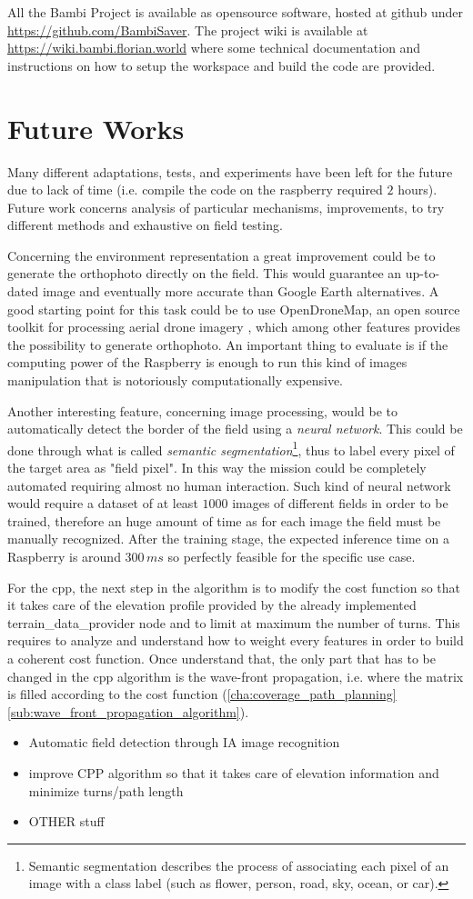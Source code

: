 All the Bambi Project is available as opensource software, hosted at github under \url{https://github.com/BambiSaver}.
The project wiki is available at \url{https://wiki.bambi.florian.world} where some technical documentation and instructions on how to setup the workspace and build the code are provided.

\section{Future Works} %
\label{sec:future_work}
Many different adaptations, tests, and experiments have been left for the future due to lack of time (i.e. compile the code on the raspberry required $2$ hours). Future work concerns analysis of particular mechanisms, improvements, to try different methods and exhaustive on field testing.\par
Concerning the environment representation a great improvement could be to generate the orthophoto directly on the field. This would guarantee an up-to-dated image and eventually more accurate than Google Earth alternatives. A good starting point for this task could be to use \textsf{OpenDroneMap}, an open source toolkit for processing aerial drone imagery \cite{ODM}, which among other features provides the possibility to generate orthophoto. An important thing to evaluate is if the computing power of the Raspberry is enough to run this kind of images manipulation that is notoriously computationally expensive.\par
Another interesting feature, concerning image processing, would be to automatically detect the border of the field using a \textit{neural network}. This could be done through what is called \textit{semantic segmentation}\footnote{ Semantic segmentation describes the process of associating each pixel of an image with a class label (such as flower, person, road, sky, ocean, or car).}, thus to label every pixel of the target area as "field pixel". In this way the mission could be completely automated requiring almost no human interaction. Such kind of neural network would require a dataset of at least $1000$ images of different fields in order to be trained, therefore an huge amount of time as for each image the field must be manually recognized. After the training stage, the expected inference time on a Raspberry is around $300\, ms$ so perfectly feasible for the specific use case.\par
For the \acrfull{cpp}, the next step in the algorithm is to modify the cost function so that it takes care of the elevation profile provided by the already implemented \textsf{terrain\_data\_provider} node and to limit at maximum the number of turns. This requires to analyze and understand how to weight every features in order to build a coherent cost function. Once understand that, the only part that has to be changed in the \acrshort{cpp} algorithm is the wave-front propagation, i.e. where the matrix is filled according to the cost function (\autoref{cha:coverage_path_planning} \autoref{sub:wave_front_propagation_algorithm}).


\begin{itemize}
	\item Automatic field detection through IA image recognition
	\item improve CPP algorithm so that it takes care of elevation information and minimize turns/path length
	\item OTHER stuff
\end{itemize}

